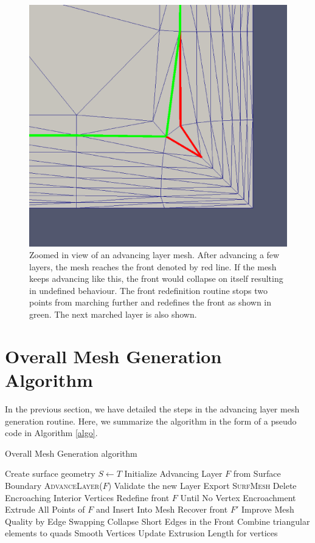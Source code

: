\documentclass[conf]{new-aiaa}
\begin{document}
\begin{figure}[hbt!]
    \centering
    \includegraphics[width=.5\textwidth]{front-before-n-after-redefinition.eps}
    \caption{Zoomed in view of an advancing layer mesh. After advancing a few layers, the mesh reaches the front denoted by red line. If the mesh keeps advancing like this, the front would collapse on itself resulting in undefined behaviour. The front redefinition routine stops two points from marching further and redefines the front as shown in green. The next marched layer is also shown.}
    \label{front-redef}
\end{figure}


\section{Overall Mesh Generation Algorithm}
In the previous section, we have detailed the steps in the advancing layer mesh generation routine. Here, we summarize the algorithm in the form of a pseudo code in Algorithm \ref{algo}.

\begin{algorithm}[hbt!]
\caption{Overall Mesh Generation algorithm}\label{alg:euclid}
\begin{algorithmic}[1]
\State Create surface geometry $S \gets T$
\State Initialize Advancing Layer $F$ from Surface Boundary
\State \textsc{AdvanceLayer($F$)}
\State Validate the new Layer
\EndWhile \label{advancing-layer-routine}
\State Export \textsc{SurfMesh}
\EndProcedure
{}
\State Delete Encroaching Interior Vertices
\State Redefine front $F$ Until No Vertex Encroachment
\State Extrude All Points of $F$ and Insert Into Mesh
\State Recover front $F'$ 
\State Improve Mesh Quality by Edge Swapping 
\State Collapse Short Edges in the Front
\State Combine triangular elements to quads
\State Smooth Vertices
\State Update Extrusion Length for vertices
\EndProcedure
\end{algorithmic}
\label{algo}
\end{algorithm}
\end{document}
